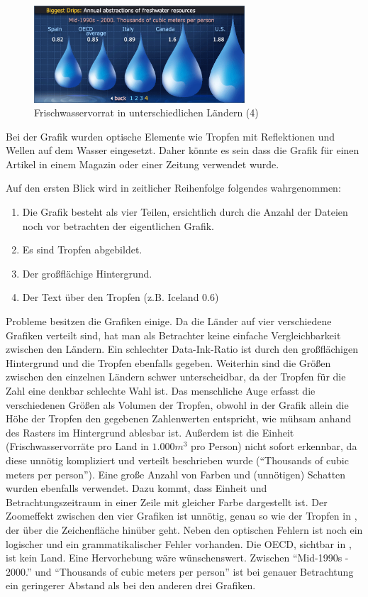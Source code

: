 \documentclass[a4paper,12pt,ngerman]{scrartcl}
\begin{document}
\begin{figure}
    \centering
    \includegraphics[width=0.7\textwidth]{includes/water-3}
    \caption{Frischwasservorrat in unterschiedlichen Ländern (4)}
    \label{water-3}
\end{figure}

Bei der Grafik wurden optische Elemente wie Tropfen mit Reflektionen und Wellen auf dem Wasser eingesetzt. Daher könnte es sein dass die Grafik für einen Artikel in einem Magazin oder einer Zeitung verwendet wurde.

Auf den ersten Blick wird in zeitlicher Reihenfolge folgendes wahrgenommen:

\begin{enumerate}
	\item Die Grafik besteht als vier Teilen, ersichtlich durch die Anzahl der Dateien noch vor betrachten der eigentlichen Grafik.
	\item Es sind Tropfen abgebildet.
	\item Der großflächige Hintergrund.
	\item Der Text über den Tropfen (z.B. Iceland 0.6)
\end{enumerate}

Probleme besitzen die Grafiken einige. Da die Länder auf vier verschiedene Grafiken verteilt sind, hat man als Betrachter keine einfache Vergleichbarkeit zwischen den Ländern. Ein schlechter Data-Ink-Ratio ist durch den großflächigen Hintergrund und die Tropfen ebenfalls gegeben. Weiterhin sind die Größen zwischen den einzelnen Ländern schwer unterscheidbar, da der Tropfen für die Zahl eine denkbar schlechte Wahl ist. Das menschliche Auge erfasst die verschiedenen Größen als Volumen der Tropfen, obwohl in der Grafik allein die Höhe der Tropfen den gegebenen Zahlenwerten entspricht, wie mühsam anhand des Rasters im Hintergrund ablesbar ist. Außerdem ist die Einheit (Frischwasservorräte pro Land in $1.000 m^3$ pro Person) nicht sofort erkennbar, da diese unnötig kompliziert und verteilt beschrieben wurde (\enquote{Thousands of cubic meters per person}). Eine große Anzahl von Farben und (unnötigen) Schatten wurden ebenfalls verwendet. Dazu kommt, dass Einheit und Betrachtungszeitraum in einer Zeile mit gleicher Farbe dargestellt ist. Der Zoomeffekt zwischen den vier Grafiken ist unnötig, genau so wie der Tropfen in , der über die Zeichenfläche hinüber geht. Neben den optischen Fehlern ist noch ein logischer und ein grammatikalischer Fehler vorhanden. Die OECD, sichtbar in , ist kein Land. Eine Hervorhebung wäre wünschenswert. Zwischen \enquote{Mid-1990s - 2000.} und \enquote{Thousands of cubic meters per person} ist bei genauer Betrachtung ein geringerer Abstand als bei den anderen drei Grafiken.
\end{document}
